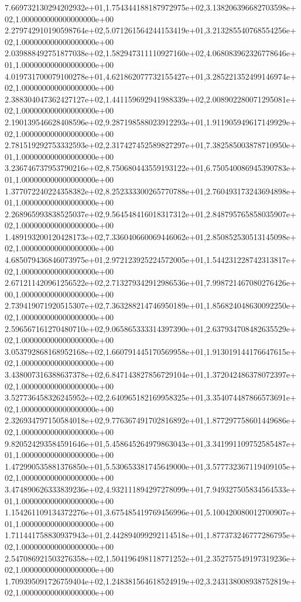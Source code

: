 7.669732130294202932e+01,1.754344188187972975e+02,3.138206396682703598e+02,1.000000000000000000e+00
2.279742910190598764e+02,5.071261564244153419e+01,3.213285540768554256e+02,1.000000000000000000e+00
2.039888492751877038e+02,1.582947311110927160e+02,4.068083962326778646e+01,1.000000000000000000e+00
4.019731700079100278e+01,4.621862077732155427e+01,3.285221352499146974e+02,1.000000000000000000e+00
2.388304047362427127e+02,1.441159692941988339e+02,2.008902280071295081e+02,1.000000000000000000e+00
2.190139546628408596e+02,9.287198588023912293e+01,1.911905949617149929e+02,1.000000000000000000e+00
2.781519292753332593e+02,2.317427452589827297e+01,7.382585003878710950e+01,1.000000000000000000e+00
3.236746737953790216e+02,8.750680443559193122e+01,6.750540086945390783e+01,1.000000000000000000e+00
1.377072240224358382e+02,8.252333300265770788e+01,2.760493173243694898e+01,1.000000000000000000e+00
2.268965993838525037e+02,9.564548416018317312e+01,2.848795765858035907e+02,1.000000000000000000e+00
1.489193200120428173e+02,7.336040660069446062e+01,2.850852530513145098e+02,1.000000000000000000e+00
4.685079436846073975e+01,2.972123925224572005e+01,1.544231228742313817e+02,1.000000000000000000e+00
2.671211420961256522e+02,2.713279342912986536e+01,7.998721467080276426e+00,1.000000000000000000e+00
2.739419071920515307e+02,7.363288214746950189e+01,1.856824048630092250e+02,1.000000000000000000e+00
2.596567161270480710e+02,9.065865333314397390e+01,2.637934708482635529e+02,1.000000000000000000e+00
3.053792868168952168e+02,1.660791445170569958e+01,1.913019144176647615e+02,1.000000000000000000e+00
3.438007316388637378e+02,6.847143827856729104e+01,1.372042486378072397e+02,1.000000000000000000e+00
3.527736458326245952e+02,2.640965182169958325e+01,3.354074487866573691e+02,1.000000000000000000e+00
2.326934797150584018e+02,9.776367491702816892e+01,1.877297758601449686e+02,1.000000000000000000e+00
9.820524293584591646e+01,5.458645264979863043e+01,3.341991109752585487e+01,1.000000000000000000e+00
1.472990535881376850e+01,5.530653381745649000e+01,3.577732367119409105e+02,1.000000000000000000e+00
3.474890626333839236e+02,4.932111894297278099e+01,7.949327505834564533e+01,1.000000000000000000e+00
1.154261109134372276e+01,3.675485419769456996e+01,5.100420080012700907e+01,1.000000000000000000e+00
1.711441758830937943e+01,2.442894099292114518e+01,1.877373246777286795e+02,1.000000000000000000e+00
2.547086921503276358e+02,1.504196498118771252e+01,2.352757549197319236e+02,1.000000000000000000e+00
1.709395091726759404e+02,1.248381564618524919e+02,3.243138008938752819e+02,1.000000000000000000e+00
